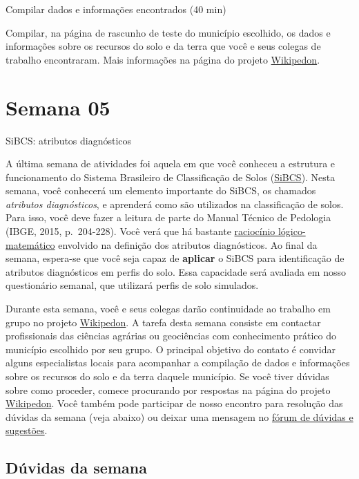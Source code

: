 \documentclass[
  11pt,
  a4paper,
  dvipsnames]{tufte-book}
\begin{document}
Compilar dados e informações encontrados (40 min)

Compilar, na página de rascunho de teste do município escolhido, os dados e informações sobre os recursos do solo e da terra que você e seus colegas de trabalho encontraram. Mais informações na página do projeto \href{https://pt.wikiversity.org/wiki/Wikipedon}{Wikipedon}.

\hypertarget{semana-05}{%
\chapter{Semana 05}\label{semana-05}}

SiBCS: atributos diagnósticos

A última semana de atividades foi aquela em que você conheceu a estrutura e funcionamento do Sistema Brasileiro de Classificação de Solos (\href{https://www.embrapa.br/en/solos/sibcs}{SiBCS}). Nesta semana, você conhecerá um elemento importante do SiBCS, os chamados \emph{atributos diagnósticos}, e aprenderá como são utilizados na classificação de solos. Para isso, você deve fazer a leitura de parte do Manual Técnico de Pedologia (IBGE, 2015, p.~204-228). Você verá que há bastante \href{https://pt.wikipedia.org/wiki/Racioc\%C3\%ADnio_l\%C3\%B3gico-matem\%C3\%A1tico}{raciocínio lógico-matemático} envolvido na definição dos atributos diagnósticos. Ao final da semana, espera-se que você seja capaz de \textbf{aplicar} o SiBCS para identificação de atributos diagnósticos em perfis do solo. Essa capacidade será avaliada em nosso questionário semanal, que utilizará perfis de solo simulados.

Durante esta semana, você e seus colegas darão continuidade ao trabalho em grupo no projeto \href{https://pt.wikiversity.org/wiki/Wikipedon}{Wikipedon}. A tarefa desta semana consiste em contactar profissionais das ciências agrárias ou geociências com conhecimento prático do município escolhido por seu grupo. O principal objetivo do contato é convidar alguns especialistas locais para acompanhar a compilação de dados e informações sobre os recursos do solo e da terra daquele município. Se você tiver dúvidas sobre como proceder, comece procurando por respostas na página do projeto \href{https://pt.wikiversity.org/wiki/Wikipedon}{Wikipedon}. Você também pode participar de nosso encontro para resolução das dúvidas da semana (veja abaixo) ou deixar uma mensagem no \href{https://moodle.utfpr.edu.br/mod/forum/view.php?id=573329}{fórum de dúvidas e sugestões}.

\hypertarget{duxfavidas-da-semana-3}{%
\section{Dúvidas da semana}\label{duxfavidas-da-semana-3}}
\end{document}
